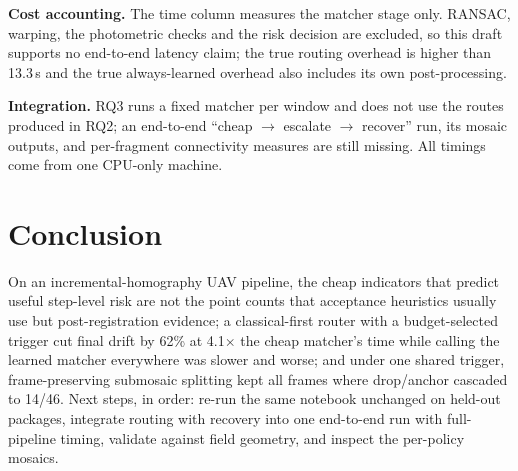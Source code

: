 \documentclass[conference]{IEEEtran}
\begin{document}
\textbf{Cost accounting.} The time column measures the matcher stage only.
RANSAC, warping, the photometric checks and the risk decision are excluded, so
this draft supports no end-to-end latency claim; the true routing overhead is
higher than 13.3\,s and the true always-learned overhead also includes its
own post-processing.

\textbf{Integration.} RQ3 runs a fixed matcher per window and does not use the
routes produced in RQ2; an end-to-end ``cheap $\to$ escalate $\to$ recover''
run, its mosaic outputs, and per-fragment connectivity measures are still
missing. All timings come from one CPU-only machine.

\section{Conclusion}
On an incremental-homography UAV pipeline, the cheap indicators that predict
useful step-level risk are not the point counts that acceptance heuristics
usually use but post-registration evidence; a classical-first router with a
budget-selected trigger cut final drift by 62\% at 4.1$\times$ the cheap
matcher's time while calling the learned matcher everywhere was slower and
worse; and under one shared trigger, frame-preserving submosaic splitting kept
all frames where drop/anchor cascaded to 14/46. Next steps, in order: re-run
the same notebook unchanged on held-out packages, integrate routing with
recovery into one end-to-end run with full-pipeline timing, validate against
field geometry, and inspect the per-policy mosaics.
\end{document}
